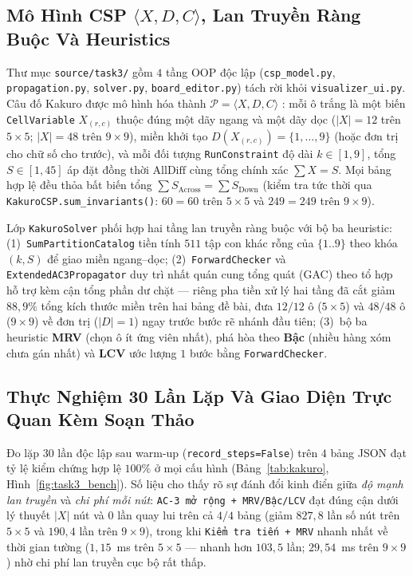\documentclass[conference]{IEEEtran}
\begin{document}
\subsection{Mô Hình CSP $\langle X, D, C \rangle$, Lan Truyền Ràng Buộc Và Heuristics}
Thư mục \texttt{source/task3/} gồm $4$ tầng OOP độc lập (\texttt{csp\_model.py}, \texttt{propagation.py}, \texttt{solver.py}, \texttt{board\_editor.py}) tách rời khỏi \texttt{visualizer\_ui.py}. Câu đố Kakuro được mô hình hóa thành $\mathcal{P} = \langle X, D, C \rangle$ \cite{simonis2008kakuro,mackworth1977consistency}: mỗi ô trắng là một biến \texttt{CellVariable} $X_{(r,c)}$ thuộc đúng một dãy ngang và một dãy dọc ($|X|=12$ trên $5\times 5$; $|X|=48$ trên $9\times 9$), miền khởi tạo $D(X_{(r,c)}) = \{1, \dots, 9\}$ (hoặc đơn trị cho chữ số cho trước), và mỗi đối tượng \texttt{RunConstraint} độ dài $k \in [1, 9]$, tổng $S \in [1, 45]$ áp đặt đồng thời $\text{AllDiff}$ cùng tổng chính xác $\sum X = S$. Mọi bảng hợp lệ đều thỏa bất biến tổng $\sum S_{\text{Across}} = \sum S_{\text{Down}}$ (kiểm tra tức thời qua \texttt{KakuroCSP.sum\_invariants()}: $60=60$ trên $5\times 5$ và $249=249$ trên $9\times 9$).

Lớp \texttt{KakuroSolver} phối hợp hai tầng lan truyền ràng buộc với bộ ba heuristic: (1)~\texttt{SumPartitionCatalog} tiền tính $511$ tập con khác rỗng của $\{1..9\}$ theo khóa $(k, S)$ để giao miền ngang--dọc; (2)~\texttt{ForwardChecker} và \texttt{ExtendedAC3Propagator} duy trì nhất quán cung tổng quát (GAC) theo tổ hợp hỗ trợ kèm cận tổng phần dư chặt --- riêng pha tiền xử lý hai tầng đã cắt giảm $88,9\%$ tổng kích thước miền trên hai bảng đề bài, đưa $12/12$ ô ($5\times 5$) và $48/48$ ô ($9\times 9$) về đơn trị ($|D|=1$) ngay trước bước rẽ nhánh đầu tiên; (3)~bộ ba heuristic \textbf{MRV} (chọn ô ít ứng viên nhất), phá hòa theo \textbf{Bậc} (nhiều hàng xóm chưa gán nhất) và \textbf{LCV} ước lượng $1$ bước bằng \texttt{ForwardChecker}.

\subsection{Thực Nghiệm 30 Lần Lặp Và Giao Diện Trực Quan Kèm Soạn Thảo}
Đo lặp $30$ lần độc lập sau warm-up (\texttt{record\_steps=False}) trên $4$ bảng JSON đạt tỷ lệ kiểm chứng hợp lệ $100\%$ ở mọi cấu hình (Bảng~\ref{tab:kakuro}, Hình~\ref{fig:task3_bench}). Số liệu cho thấy rõ sự đánh đổi kinh điển giữa \emph{độ mạnh lan truyền} và \emph{chi phí mỗi nút}: \texttt{AC-3 mở rộng + MRV/Bậc/LCV} đạt đúng cận dưới lý thuyết $|X|$ nút và $0$ lần quay lui trên cả $4/4$ bảng (giảm $827,8$ lần số nút trên $5\times 5$ và $190,4$ lần trên $9\times 9$), trong khi \texttt{Kiểm tra tiến + MRV} nhanh nhất về thời gian tường ($1,15$~ms trên $5\times 5$ --- nhanh hơn $103,5$ lần; $29,54$~ms trên $9\times 9$) nhờ chi phí lan truyền cục bộ rất thấp.
\end{document}
